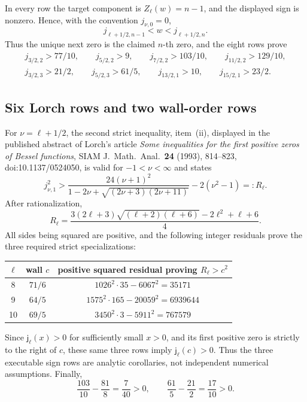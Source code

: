 \documentclass[11pt]{article}
\begin{document}
In every row the target component is \(Z_\ell(w)=n-1\), and the displayed
sign is nonzero.  Hence, with the convention \(j_{\nu,0}=0\),
\[
 j_{\ell+1/2,n-1}<w<j_{\ell+1/2,n}.
\]
Thus the unique next zero is the claimed \(n\)-th zero, and the eight rows
prove
\begin{equation}
\begin{gathered}
 j_{3/2,2}>77/10,\qquad j_{5/2,2}>9,\qquad
 j_{7/2,2}>103/10,\qquad j_{11/2,2}>129/10,\\
 j_{3/2,3}>21/2,\qquad j_{5/2,3}>61/5,\qquad
 j_{13/2,1}>10,\qquad j_{15/2,1}>23/2.
\end{gathered}
\label{eq:indexed-zero-registry}
\end{equation}

\subsection{Six Lorch rows and two wall-order rows}

For \(\nu=\ell+1/2\), the second strict inequality, item~(ii), displayed
in the published abstract of Lorch's article \emph{Some inequalities for
the first positive zeros of Bessel functions}, SIAM J.\ Math.\ Anal.\
\textbf{24} (1993), 814--823, doi:10.1137/0524050, is valid for
\(-1<\nu<\infty\) and states
\[
 j_{\nu,1}^2>
 \frac{24(\nu+1)^2}{1-2\nu+\sqrt{(2\nu+3)(2\nu+11)}}
 -2(\nu^2-1)=:R_\ell.
\]
After rationalization,
\[
 R_\ell=\frac{3(2\ell+3)\sqrt{(\ell+2)(\ell+6)}
 -2\ell^2+\ell+6}{4}.
\]
All sides being squared are positive, and the following integer residuals
prove the three required strict specializations:
\begin{center}
\begin{tabular}{c|c|c}
\toprule
\(\ell\)&wall \(c\)&positive squared residual proving \(R_\ell>c^2\)\\
\midrule
8&\(71/6\)&\(1026^2\cdot35-6067^2=35171\)\\
9&\(64/5\)&\(1575^2\cdot165-20059^2=6939644\)\\
10&\(69/5\)&\(3450^2\cdot3-5911^2=767579\)\\
\bottomrule
\end{tabular}
\end{center}
Since \(\mathsf j_\ell(x)>0\) for sufficiently small \(x>0\), and its
first positive zero is strictly to the right of \(c\), these same three
rows imply \(\mathsf j_\ell(c)>0\).  Thus the three executable sign rows
are analytic corollaries, not independent numerical assumptions.  Finally,
\[
 \frac{103}{10}-\frac{81}{8}=\frac7{40}>0,
 \qquad
 \frac{61}{5}-\frac{21}{2}=\frac{17}{10}>0.
\]
\end{document}
